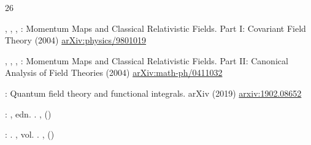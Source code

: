\documentclass[12pt]{article}%
\begin{document}
\begin{thebibliography}{26}
    \begin{botherref}
    ,
    ,
    ,
    :
    Momentum {{Maps}} and {{Classical Relativistic Fields}}. {{Part I}}: {{Covariant Field Theory}}
    (2004)
    {\href{https://arxiv.org/abs/physics/9801019}{{arXiv:physics/9801019}}}
    \end{botherref}
    \endbibitem
    
       \begin{botherref}
       ,
       ,
       ,
       :
       Momentum {{Maps}} and {{Classical Relativistic Fields}}. {{Part II}}: {{Canonical Analysis}} of {{Field Theories}}
       (2004)
       {\href{https://arxiv.org/abs/math-ph/0411032}{{arXiv:math-ph/0411032}}}
       \end{botherref}
       \endbibitem
    \endbibitem


    \begin{botherref}
    :
    Quantum field theory and functional integrals.
    arXiv
    (2019)
    {\href{https://arxiv.org/abs/1902.08652}{{arxiv:1902.08652}}}
    \end{botherref}
    \endbibitem


    

    
    \begin{bbook}
    :
    ,
     edn.
    .
    ,
    ()
    \end{bbook}
    \endbibitem
    
    \begin{bbook}
    :
    .
    ,
    vol. .
    ,
    ()
    \end{bbook}
    \endbibitem
    
    \end{thebibliography}


    

    
\end{document}
